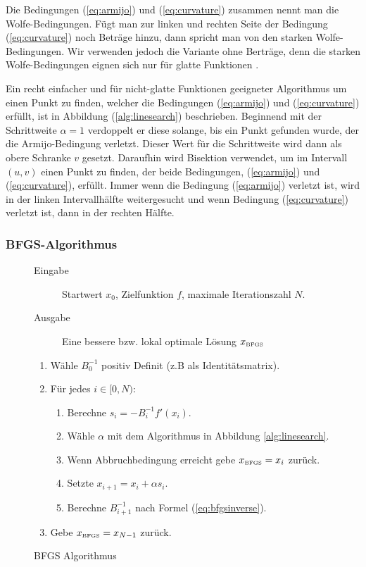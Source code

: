 \documentclass[runningheads,a4paper]{llncs}
\begin{document}
Die Bedingungen (\ref{eq:armijo}) und (\ref{eq:curvature}) zusammen nennt man die Wolfe-Bedingungen. Fügt man zur linken und rechten Seite der Bedingung (\ref{eq:curvature}) noch Beträge hinzu, dann spricht man von den starken Wolfe-Bedingungen. Wir verwenden jedoch die Variante ohne Berträge, denn die starken Wolfe-Bedingungen eignen sich nur für glatte Funktionen \cite{DBLP:journals/mp/LewisO13}.

Ein recht einfacher und für nicht-glatte Funktionen geeigneter Algorithmus um einen Punkt zu finden, welcher die Bedingungen (\ref{eq:armijo}) und (\ref{eq:curvature}) erfüllt, ist in Abbildung (\ref{alg:linesearch}) beschrieben. Beginnend mit der Schrittweite $\alpha=1$ verdoppelt er diese solange, bis ein Punkt gefunden wurde, der die Armijo-Bedingung verletzt. Dieser Wert für die Schrittweite wird dann als obere Schranke $v$ gesetzt. Daraufhin wird Bisektion verwendet, um im Intervall $(u,v)$ einen Punkt zu finden, der beide Bedingungen, (\ref{eq:armijo}) und (\ref{eq:curvature}), erfüllt. Immer wenn die Bedingung (\ref{eq:armijo}) verletzt ist, wird in der linken Intervallhälfte weitergesucht und wenn Bedingung (\ref{eq:curvature}) verletzt ist, dann in der rechten Hälfte.

\subsubsection{BFGS-Algorithmus}
\begin{figure}[ht]
 \centering
 \begin{description}
 \item[Eingabe] Startwert $x_0$, Zielfunktion $f$, maximale Iterationszahl $N$.
 \item[Ausgabe] Eine bessere bzw. lokal optimale Lösung $x_{\text{\tiny{BFGS}}}$
 \end{description}
 \begin{enumerate}
 	\item Wähle $B_0^{-1}$ positiv Definit (z.B als Identitätsmatrix).
 	\item Für jedes $i \in [0,N)$:
 	\begin{enumerate}
 	\item Berechne $s_i = - B_i^{-1} f'(x_i)$.
 	\item Wähle $\alpha$ mit dem Algorithmus in Abbildung \ref{alg:linesearch}.
 	\item Wenn Abbruchbedingung erreicht gebe $x_{\text{\tiny{BFGS}}} = x_i$ zurück.
 	\item Setzte $x_{i+1} = x_i + \alpha s_i$.
 	\item Berechne $B_{i+1}^{-1}$ nach Formel (\ref{eq:bfgsinverse}).
 	\end{enumerate}
 	\item Gebe $x_{\text{\tiny{BFGS}}} = x_{N-1}$ zurück.
 \end{enumerate}
 \caption{BFGS Algorithmus}
 \label{alg:bfgs}
\end{figure}
\end{document}
